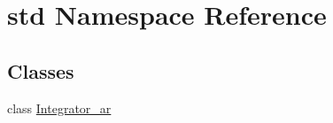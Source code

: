\hypertarget{namespacestd}{\section{std Namespace Reference}
\label{namespacestd}
}
\subsection*{Classes}
\begin{DoxyCompactItemize}
\item 
class \hyperlink{classstd_1_1_integrator__ar}{Integrator\-\_\-ar}
\end{DoxyCompactItemize}

